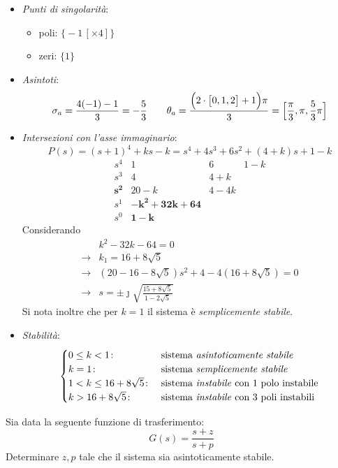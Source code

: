 \begin{itemize}
	\item \emph{Punti di singolarità}:
		\begin{itemize}
			\item poli: \(\bigl\{-1\,[\times 4]\bigr\}\)
			\item zeri: \(\bigl\{1\bigr\}\)
		\end{itemize}
	\item \emph{Asintoti}:
		\[
			\sigma_a = \frac{4(-1)-1}{3} = -\frac{5}{3} \qquad
			\theta_a = \frac{\Bigl(2\cdot\bigl[0,1,2\bigr]+1\Bigr)\pi}{3} = \Bigl[\frac{\pi}{3},\pi,\frac{5}{3}\pi\Bigr]
		\]
	\item \emph{Intersezioni con l'asse immaginario}:
		\[
			P(s) = (s+1)^4 +ks -k = s^4+4s^3+6s^2+(4+k)s+1-k
		\]
		\[\begin{array}{r|rrr}
			s^4 & 1 & 6 & 1-k \\
			s^3 & 4 & 4+k \\
			\bm{s^2} & 20-k & 4-4k \\
			s^1 & \bm{-k^2+32k+64} \\
			s^0 & \bm{1-k}
		\end{array}\]
		Considerando
		\begin{align*}
			& k^2-32k-64=0 \\
			\rightarrow & k_1 = 16+8\sqrt{5} \\
			\rightarrow & (20-16-8\sqrt{5})s^2 +4-4(16+8\sqrt{5}) =0 \\
			\rightarrow & s=\pm\jmath\sqrt{\frac{15+8\sqrt{5}}{1-2\sqrt{5}}}
		\end{align*}
		Si nota inoltre che per \(k=1\) il sistema è \emph{semplicemente stabile}.
	\item \emph{Stabilità}:
		\[\begin{cases}
			0 \leq k < 1\colon & \text{sistema \emph{asintoticamente stabile}} \\
			k = 1\colon & \text{sistema \emph{semplicemente stabile}} \\
			1 < k \leq 16+8\sqrt{5}\colon & \text{sistema \emph{instabile} con 1 polo instabile} \\
			k > 16+8\sqrt{5}\colon & \text{sistema \emph{instabile} con 3 poli instabili}
		\end{cases}\]
\end{itemize}

\exercise{}
Sia data la seguente funzione di trasferimento:
\[
	G(s) = \frac{s+z}{s+p}
\]
Determinare \(z,p\) tale che il sistema sia asintoticamente stabile.


